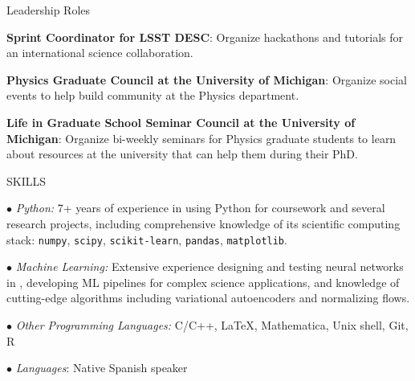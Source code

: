 \begin{rSection}{Leadership Roles} \itemsep -3pt \vspace*{-.25cm}
\item{\textbf{Sprint Coordinator for LSST DESC}: Organize hackathons and tutorials for an international science collaboration.}

\item{\textbf{Physics Graduate Council at the University of Michigan}: Organize social events to help build community at the Physics department.}

\item{\textbf{Life in Graduate School Seminar Council at the University of Michigan}: Organize bi-weekly seminars for Physics graduate students to learn about resources at the university that can help them during their PhD.}
\end{rSection}


\begin{rSection}{SKILLS}
\vspace*{-0.3cm}
\item {\small $\bullet$} \textit{Python:} 7+ years of experience in using Python for coursework and several research projects, including comprehensive knowledge of its scientific computing stack: \texttt{numpy}, \texttt{scipy}, \texttt{scikit-learn}, \texttt{pandas}, \texttt{matplotlib}.

\item {\small $\bullet$} \textit{Machine Learning:} Extensive experience designing and testing neural networks in \pytorch, developing ML pipelines for complex science applications, and knowledge of cutting-edge algorithms including variational autoencoders and normalizing flows.

\item {\small $\bullet$} \textit{Other Programming Languages:} C/C++, \LaTeX, Mathematica, Unix shell, Git, R      

\item {\small $\bullet$} \textit{Languages}: Native Spanish speaker
\end{rSection}


